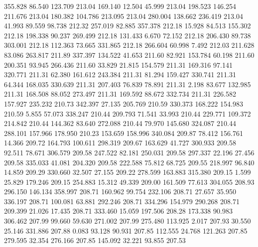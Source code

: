  355.828   86.540  123.709       213.04
 169.140   12.504   45.999       213.04
 198.523  146.254  211.676       213.04
 180.382  104.786  213.095       213.04
 280.004  138.662  236.419       213.04
  41.993   89.559   98.738       212.32
 257.019   82.885  357.378       212.18
  15.928   84.513  155.302       212.18
 198.338   90.237  269.499       212.18
 131.433    6.670   72.152       212.18
 206.430   89.738  303.001       212.18
 112.363   73.665  331.865       212.18
 266.604   60.998    7.492       212.03
 211.628   83.086  263.817       211.89
 337.397  134.522   41.653       211.60
  82.921  153.784   60.198       211.60
 200.351   93.945  266.436       211.60
  33.829   21.815  154.579       211.31
 169.316   97.141  320.771       211.31
  62.380  161.612  243.384       211.31
  81.294  159.427  330.741       211.31
  64.344  168.035  330.639       211.31
 207.403   76.839   78.891       211.31
   2.198   83.677  132.985       211.31
 168.508   88.052  273.497       211.31
 169.592   88.672  332.734       211.31
 226.582  157.927  235.232       210.73
 342.397   27.135  205.769       210.59
 330.373  168.222  154.983       210.59
   5.855   57.073  338.247       210.44
 209.793   71.541   33.993       210.44
 229.771  109.372  214.842       210.44
 144.362   83.640  272.088       210.44
  79.970  145.680  324.087       210.44
 288.101  157.966  178.950       210.23
 153.659  158.996  340.084       209.87
  78.412  156.761   14.366       209.72
 164.793  100.611  298.319       209.67
 163.629   41.727  300.933       209.58
  92.511   78.671  306.579       209.58
 247.522   82.181  250.031       209.58
 297.337   22.196   27.456       209.58
 335.033   41.081  204.320       209.58
 222.588   75.812   68.725       209.55
 218.997   96.840   14.859       209.29
 330.660   32.507   27.155       209.22
 278.599  163.883  315.380       209.15
   1.599   25.829  179.246       209.15
 254.883   15.312   49.339       209.00
 161.509   77.613  304.055       208.93
 296.150  146.134  358.997       208.71
 160.962   99.754  232.106       208.71
  27.657   35.950  336.197       208.71
 100.081   63.881  292.246       208.71
 334.296  154.979  290.268       208.71
 209.399   21.026   17.435       208.71
 333.460   15.059  197.506       208.28
 173.338   90.983  306.462       207.99
  99.660   59.630  271.002       207.99
 275.480  113.925    2.017       207.93
  30.550   25.146  331.886       207.88
   0.083   93.128   90.931       207.85
 112.555   24.768  121.263       207.85
 279.595   32.354  276.166       207.85
 145.092   32.221   93.855       207.53
